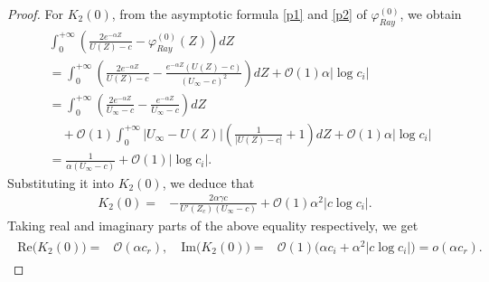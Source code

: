 \documentclass[reqno,11pt]{amsart}
\numberwithin{equation}{section}
\numberwithin{equation}{section}
\theoremstyle{plain}
\begin{document}
\begin{proof}
For $K_2(0)$, from the asymptotic formula \eqref{p1} and \eqref{p2} of $\varphi^{(0)}_{Ray}$, we obtain
			\begin{align*}
				& \int_{0}^{+\infty}\left(\frac{2e^{-\alpha Z}}{U(Z)-c}-\varphi_{Ray}^{(0)}(Z)\right)dZ\\
				&=\int_{0}^{+\infty}\left(\frac{2e^{-\alpha Z}}{U(Z)-c}-\frac{e^{-\alpha Z}(U(Z)-c)}{(U_\infty-c)^2}\right)dZ+\mathcal{O}(1)\alpha|\log c_i|\\
				&=\int_{0}^{+\infty}\left(\frac{2e^{-\alpha Z}}{U_\infty-c}-\frac{e^{-\alpha Z}}{U_\infty-c}\right)dZ\\
				&\quad+\mathcal{O}(1)\int_{0}^{+\infty}|U_\infty-U(Z)|\left(\frac{1}{|U(Z)-c|}+1\right)dZ+\mathcal{O}(1)\alpha|\log c_i|\\
				&=\frac{1}{\alpha(U_\infty-c)}+\mathcal{O}(1)|\log c_i|.
			\end{align*}
		Substituting it into $K_{2}(0)$, we deduce that
			\begin{align*}
				K_2(0)= & -\frac{2\alpha\gamma c}{U'(Z_c)(U_\infty-c)}
				+\mathcal{O}(1)\alpha^2|c\log c_i|.
			\end{align*}
		Taking real and imaginary parts of the above equality respectively, we get
			\begin{align}\label{K2-0-im}\begin{aligned}
					\text{Re}\big(K_2(0)\big) =& \mathcal{O}(\alpha c_r),\quad
					\text{Im}\big(K_2(0)\big) =& \mathcal{O}(1)\big(\alpha c_i+\alpha^2|c\log c_i|\big)=o(\alpha c_r).
			\end{aligned}\end{align} 
		

\end{proof}
\end{document}
